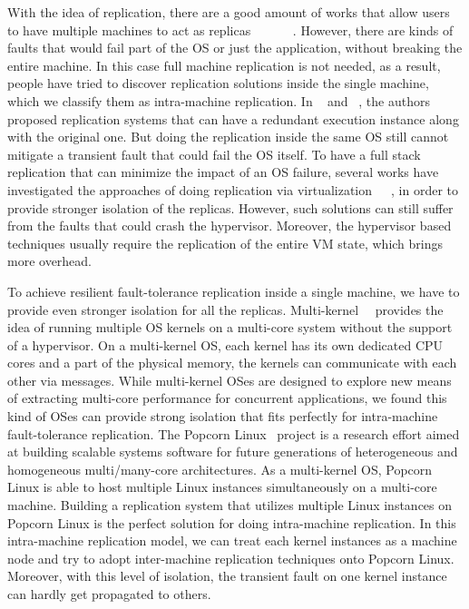 With the idea of replication, there are a good amount of works that allow users to have multiple machines to act as replicas ~\cite{guo2014rex}~\cite{kapritsos2012all}~\cite{cui2015p}~\cite{zagorodnov2009practical}~\cite{singh2009zeno}~\cite{mao2008mencius}. However, there are kinds of faults that would fail part of the OS or just the application, without breaking the entire machine. In this case full machine replication is not needed, as a result, people have tried to discover replication solutions inside the single machine, which we classify them as intra-machine replication. In ~\cite{zhang2012runtime} and ~\cite{lee2010respec}, the authors proposed replication systems that can have a redundant execution instance along with the original one. But doing the replication inside the same OS still cannot mitigate a transient fault that could fail the OS itself. To have a full stack replication that can minimize the impact of an OS failure, several works have investigated the approaches of doing replication via virtualization~\cite{bressoud1996hypervisor}~\cite{lorch2015tardigrade}~\cite{dunlap2002revirt}, in order to provide stronger isolation of the replicas. However, such solutions can still suffer from the faults that could crash the hypervisor. Moreover, the hypervisor based techniques usually require the replication of the entire VM state, which brings more overhead.

To achieve resilient fault-tolerance replication inside a single machine, we have to provide even stronger isolation for all the replicas. Multi-kernel~\cite{baumann2009multikernel}~\cite{barbalace2014popcorn} provides the idea of running multiple OS kernels on a multi-core system without the support of a hypervisor. On a multi-kernel OS, each kernel has its own dedicated CPU cores and a part of the physical memory, the kernels can communicate with each other via messages. While multi-kernel OSes are designed to explore new means of extracting multi-core performance for concurrent applications, we found this kind of OSes can provide strong isolation that fits perfectly for intra-machine fault-tolerance replication. The Popcorn Linux~\cite{barbalace2014popcorn} project is a research effort aimed at building scalable systems software for future generations of heterogeneous and homogeneous multi/many-core architectures. As a multi-kernel OS, Popcorn Linux is able to host multiple Linux instances simultaneously on a multi-core machine. Building a replication system that utilizes multiple Linux instances on Popcorn Linux is the perfect solution for doing intra-machine replication. In this intra-machine replication model, we can treat each kernel instances as a machine node and try to adopt inter-machine replication techniques onto Popcorn Linux. Moreover, with this level of isolation, the transient fault on one kernel instance can hardly get propagated to others.

